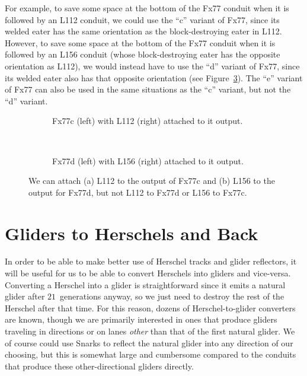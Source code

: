 For example, to save some space at the bottom of the Fx77 conduit when it is followed by an L112 conduit, we could use the ``c'' variant of Fx77, since its welded eater has the same orientation as the block-destroying eater in L112. However, to save some space at the bottom of the Fx77 conduit when it is followed by an L156 conduit (whose block-destroying eater has the opposite orientation as L112), we would instead have to use the ``d'' variant of Fx77, since its welded eater also has that opposite orientation (see Figure~\ref{fig:fx77_variants_with_l}). The ``e'' variant of Fx77 can also be used in the same situations as the ``c'' variant, but not the ``d'' variant.

\begin{figure}[!htb]
	\centering
	\begin{subfigure}{.5\textwidth}
		\centering
		\caption{Fx77c (left) with L112 (right) attached to it output.}
		\label{fig:fx77c_l112}
	\end{subfigure}\ \ \ \ %
	\begin{subfigure}{.47\textwidth}
		\centering
		\caption{Fx77d (left) with L156 (right) attached to it output.}
		\label{fig:fx77d_l156}
	\end{subfigure}
	\caption{We can attach (a) L112 to the output of Fx77c and (b) L156 to the output for Fx77d, but not L112 to Fx77d or L156 to Fx77c.}\label{fig:fx77_variants_with_l}
\end{figure}


\section{Gliders to Herschels and Back}\label{sec:glider_to_herschel}

In order to be able to make better use of Herschel tracks and glider reflectors, it will be useful for us to be able to convert Herschels into gliders and vice-versa. Converting a Herschel into a glider is straightforward since it emits a natural glider after $21$~generations anyway, so we just need to destroy the rest of the Herschel after that time. For this reason, dozens of Herschel-to-glider converters are known, though we are primarily interested in ones that produce gliders traveling in directions or on lanes \emph{other} than that of the first natural glider. We of course could use Snarks to reflect the natural glider into any direction of our choosing, but this is somewhat large and cumbersome compared to the conduits that produce these other-directional gliders directly.

